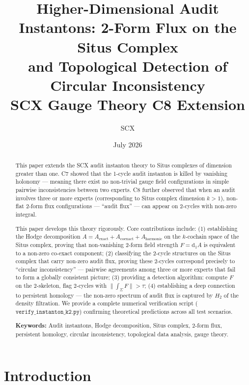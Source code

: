 \documentclass[12pt,a4paper]{article}
\title{
    \textbf{Higher-Dimensional Audit Instantons: 2-Form Flux on the Situs Complex\\and Topological Detection of Circular Inconsistency}\\[0.5em]
    \normalsize SCX Gauge Theory \textperiodcentered C8 Extension
}
\author{SCX}
\date{July 2026}
\theoremstyle{plain}
\theoremstyle{definition}
\theoremstyle{remark}
\newcommand{\dd}{\mathrm{d}}
\newcommand{\norm}[1]{\|#1\|}
\begin{document}
\maketitle

\begin{abstract}
\noindent
This paper extends the SCX audit instanton theory to Situs complexes of dimension greater than one. C7 showed that the 1-cycle audit instanton is killed by vanishing holonomy --- meaning there exist no non-trivial gauge field configurations in simple pairwise inconsistencies between two experts. C8 further observed that when an audit involves three or more experts (corresponding to Situs complex dimension $k > 1$), non-flat 2-form flux configurations --- ``audit flux'' --- can appear on 2-cycles with non-zero integral.

This paper develops this theory rigorously. Core contributions include: (1) establishing the Hodge decomposition $A = A_{\mathrm{exact}} + A_{\mathrm{coexact}} + A_{\mathrm{harmonic}}$ on the $k$-cochain space of the Situs complex, proving that non-vanishing 2-form field strength $F = \dd_1 A$ is equivalent to a non-zero co-exact component; (2) classifying the 2-cycle structures on the Situs complex that carry non-zero audit flux, proving these 2-cycles correspond precisely to ``circular inconsistency'' --- pairwise agreements among three or more experts that fail to form a globally consistent picture; (3) providing a detection algorithm: compute $F$ on the 2-skeleton, flag 2-cycles with $\norm{\int_\Sigma F} > \tau$; (4) establishing a deep connection to persistent homology --- the non-zero spectrum of audit flux is captured by $H_2$ of the density filtration. We provide a complete numerical verification script ($\texttt{verify\_instanton\_k2.py}$) confirming theoretical predictions across all test scenarios.

\vspace{0.5em}
\noindent
\textbf{Keywords:} Audit instantons, Hodge decomposition, Situs complex, 2-form flux, persistent homology, circular inconsistency, topological data analysis, gauge theory.
\end{abstract}

\section{Introduction}
\label{sec:intro}
\end{document}
